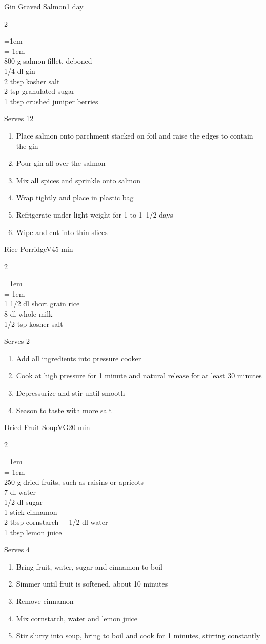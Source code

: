 \documentclass{article}
\newenvironment{recipe}[3][]
    {\begin{cardbase}[#1]{#2}{#3}
    \columnratio{0.333}
    \begin{paracol}{2}}
    {\end{paracol}\end{cardbase}}
\newcommand{\nextcolumn}{\switchcolumn}
\newenvironment{ingredients}
    {
    \begin{obeylines}
    \vspace{\parskip}
    \setlength{\parskip}{0.25em}
    \vspace{-0.25em}
    \leftskip=1em
    \parindent=-1em}
    {\end{obeylines}}
\newenvironment{steps}
    {\begin{enumerate}[leftmargin=*,topsep=0pt]}
    {\end{enumerate}}
\newcommand{\tag}[1]{\hspace{1em}#1}
\newcommand{\symboltag}[2]{\tag{#1\hspace{0.4em}#2}}
\newcommand{\totaltime}[1]{\symboltag{\raisebox{-0.1em}{\small\StopWatchEnd}}{#1}}
\begin{document}
\begin{recipe}{Gin Graved Salmon}{\totaltime{1 day}}
\begin{ingredients}
800 g salmon fillet, deboned
1/4 dl gin
2 tbsp kosher salt
2 tsp granulated sugar
1 tbsp crushed juniper berries
\end{ingredients}
\nextcolumn
Serves 12
\begin{steps}
    \item Place salmon onto parchment stacked on foil and raise the edges to contain the gin
    \item Pour gin all over the salmon
    \item Mix all spices and sprinkle onto salmon
    \item Wrap tightly and place in plastic bag
    \item Refrigerate under light weight for 1 to 1~1/2 days
    \item Wipe and cut into thin slices
\end{steps}
\end{recipe}

\begin{recipe}{Rice Porridge}{\tag{V}\totaltime{45 min}}
\begin{ingredients}
1 1/2 dl short grain rice
8 dl whole milk
1/2 tsp kosher salt
\end{ingredients}
\nextcolumn
Serves 2
\begin{steps}
    \item Add all ingredients into pressure cooker
    \item Cook at high pressure for 1 minute and natural release for at least 30 minutes
    \item Depressurize and stir until smooth
    \item Season to taste with more salt
\end{steps}
\end{recipe}

\begin{recipe}{Dried Fruit Soup}{\tag{VG}\totaltime{20 min}}
\begin{ingredients}
250 g dried fruits, such as raisins or apricots
7 dl water
1/2 dl sugar
1 stick cinnamon
2 tbsp cornstarch + 1/2 dl water
1 tbsp lemon juice
\end{ingredients}
\nextcolumn
Serves 4
\begin{steps}
    \item Bring fruit, water, sugar and cinnamon to boil
    \item Simmer until fruit is softened, about 10 minutes
    \item Remove cinnamon
    \item Mix cornstarch, water and lemon juice
    \item Stir slurry into soup, bring to boil and cook for 1 minutes, stirring constantly
\end{steps}
\end{recipe}
\end{document}

